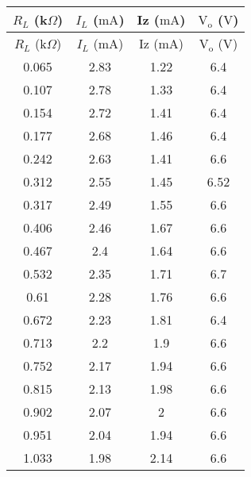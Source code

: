\documentclass{scrartcl}
\begin{document}
\begin{longtable}{|c|c|c|c|} 
        \hline
        $R_L$ (k$\Omega$) & {$I_L$ ($\mathrm{mA}$)} & {Iz ($\mathrm{mA}$)} & {$\mathrm{V_o}$ ($\mathrm{V}$)} \\ \hline
        \endfirsthead
        \hline 
        {$R_L$ (k$\Omega$)} & {$I_L$ ($\mathrm{mA}$)} & {Iz ($\mathrm{mA}$)} & {$\mathrm{V_o}$ ($\mathrm{V}$)} \\ \hline
        \endhead
        
        \hline
        \endfoot
        
        \hline
        \endlastfoot
        
        0.065       & 2.83      & 1.22    & 6.4     \\ \hline
        0.107       & 2.78      & 1.33    & 6.4     \\ \hline
        0.154       & 2.72      & 1.41    & 6.4     \\ \hline
        0.177       & 2.68      & 1.46    & 6.4     \\ \hline
        0.242       & 2.63      & 1.41    & 6.6     \\ \hline
        0.312       & 2.55      & 1.45    & 6.52    \\ \hline
        0.317       & 2.49      & 1.55    & 6.6     \\ \hline
        0.406       & 2.46      & 1.67    & 6.6     \\ \hline
        0.467       & 2.4       & 1.64    & 6.6     \\ \hline
        0.532       & 2.35      & 1.71    & 6.7     \\ \hline
        0.61        & 2.28      & 1.76    & 6.6     \\ \hline
        0.672       & 2.23      & 1.81    & 6.4     \\ \hline
        0.713       & 2.2       & 1.9     & 6.6     \\ \hline
        0.752       & 2.17      & 1.94    & 6.6     \\ \hline
        0.815       & 2.13      & 1.98    & 6.6     \\ \hline
        0.902       & 2.07      & 2       & 6.6     \\ \hline
        0.951       & 2.04      & 1.94    & 6.6     \\ \hline
        1.033       & 1.98      & 2.14    & 6.6     \\ \hline
        
        \end{longtable}
\end{document}

